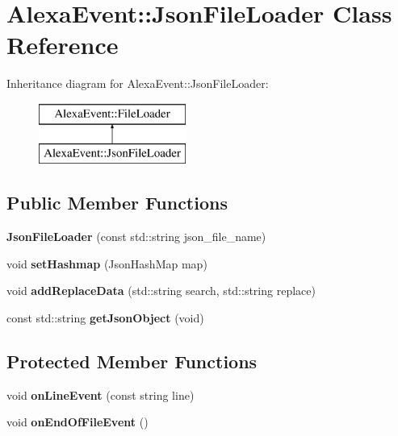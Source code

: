 \hypertarget{classAlexaEvent_1_1JsonFileLoader}{}\section{Alexa\+Event\+:\+:Json\+File\+Loader Class Reference}
\label{classAlexaEvent_1_1JsonFileLoader}
Inheritance diagram for Alexa\+Event\+:\+:Json\+File\+Loader\+:\begin{figure}[H]
\begin{center}
\leavevmode
\includegraphics[height=2.000000cm]{d9/d8d/classAlexaEvent_1_1JsonFileLoader}
\end{center}
\end{figure}
\subsection*{Public Member Functions}
\begin{DoxyCompactItemize}
\item 
\mbox{\label{classAlexaEvent_1_1JsonFileLoader_a7edbb0f861213e85bc835ee4bbd9e2df}} 
{\bfseries Json\+File\+Loader} (const std\+::string json\+\_\+file\+\_\+name)
\item 
\mbox{\label{classAlexaEvent_1_1JsonFileLoader_a864a274a345d6f1a16973e6abfedad76}} 
void {\bfseries set\+Hashmap} (Json\+Hash\+Map map)
\item 
\mbox{\label{classAlexaEvent_1_1JsonFileLoader_a05e6ad6b705addf961268179811f8976}} 
void {\bfseries add\+Replace\+Data} (std\+::string search, std\+::string replace)
\item 
\mbox{\label{classAlexaEvent_1_1JsonFileLoader_aa97f567ba6e9c358cc361109b5d23e72}} 
const std\+::string {\bfseries get\+Json\+Object} (void)
\end{DoxyCompactItemize}
\subsection*{Protected Member Functions}
\begin{DoxyCompactItemize}
\item 
\mbox{\label{classAlexaEvent_1_1JsonFileLoader_a39ca49e1e9168bc54564a90ff81cb562}} 
void {\bfseries on\+Line\+Event} (const string line)
\item 
\mbox{\label{classAlexaEvent_1_1JsonFileLoader_a7562ccc54984ea688e13b5fce560126c}} 
void {\bfseries on\+End\+Of\+File\+Event} ()
\end{DoxyCompactItemize}


